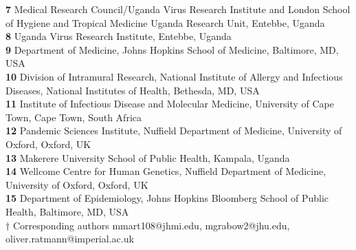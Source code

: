 \documentclass[10pt,letterpaper]{article}
\begin{document}
\begin{flushleft}
\textbf{7} Medical Research Council/Uganda Virus Research Institute and London School of Hygiene and Tropical Medicine Uganda Research Unit, Entebbe, Uganda \\

\textbf{8} Uganda Virus Research Institute, Entebbe, Uganda \\

\textbf{9} Department of Medicine, Johns Hopkins School of Medicine, Baltimore, MD, USA
\\
\textbf{10} Division of Intramural Research, National Institute of Allergy and Infectious Diseases, National Institutes of Health, Bethesda, MD, USA
\\
\textbf{11} Institute of Infectious Disease and Molecular Medicine, University of Cape Town, Cape Town, South Africa
\\
\textbf{12} Pandemic Sciences Institute, Nuffield Department of Medicine, University of Oxford, Oxford, UK \\

\textbf{13} Makerere University School of Public Health, Kampala, Uganda \\

\textbf{14} Wellcome Centre for Human Genetics, Nuffield Department of Medicine, University of Oxford, Oxford, UK \\

\textbf{15} Department of Epidemiology, Johns Hopkins Bloomberg School of Public Health, Baltimore, MD, USA \\

\bigskip
$\dagger$ Corresponding authors mmart108@jhmi.edu, mgrabow2@jhu.edu, oliver.ratmann@imperial.ac.uk 
\end{flushleft}
\end{document}
